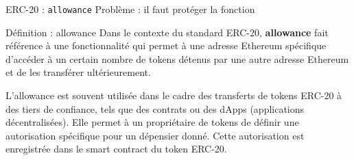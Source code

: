 \begin{frame}[fragile]{ERC-20 : \texttt{allowance}}
  Problème : il faut protéger la fonction 

  \begin{block}{Définition : allowance}
    Dans le contexte du standard ERC-20, \textbf{allowance} fait référence à une fonctionnalité qui permet à une adresse Ethereum spécifique d'accéder à un certain nombre de tokens détenus par une autre adresse Ethereum et de les transférer ultérieurement.

    L'allowance est souvent utilisée dans le cadre des transferts de tokens ERC-20 à des tiers de confiance, tels que des contrats ou des dApps (applications décentralisées).
    Elle permet à un propriétaire de tokens de définir une autorisation spécifique pour un dépensier donné.
    Cette autorisation est enregistrée dans le smart contract du token ERC-20.
  \end{block}
\end{frame}

